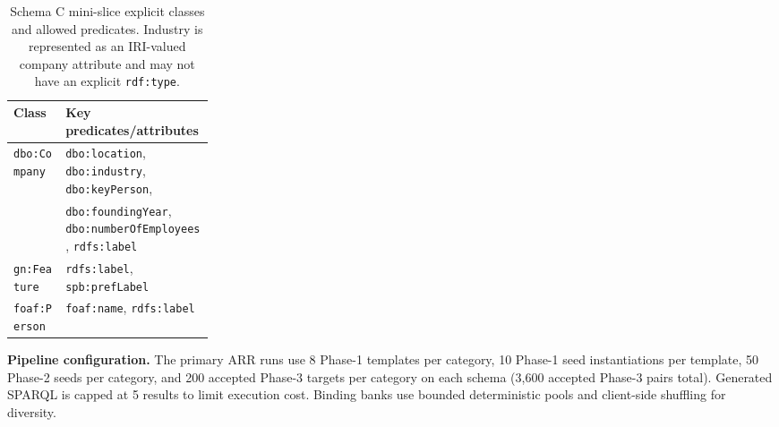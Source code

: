 \documentclass[11pt]{article}
\begin{document}
\begin{table}[t]
  \centering
  \small
  \setlength{\tabcolsep}{4pt}
  \begin{tabularx}{\linewidth}{>{\raggedright\arraybackslash}p{0.26\linewidth} X}
    \toprule
    Class & Key predicates/attributes \\
    \midrule
    \texttt{dbo:Company} & \texttt{dbo:location}, \texttt{dbo:industry}, \texttt{dbo:keyPerson}, \\
    & \texttt{dbo:foundingYear}, \texttt{dbo:numberOfEmployees}, \texttt{rdfs:label} \\
    \texttt{gn:Feature} & \texttt{rdfs:label}, \texttt{spb:prefLabel} \\
    \texttt{foaf:Person} & \texttt{foaf:name}, \texttt{rdfs:label} \\
    \bottomrule
  \end{tabularx}
	  \caption{Schema C mini-slice explicit classes and allowed predicates. Industry is represented as an IRI-valued company attribute and may not have an explicit \texttt{rdf:type}.}
  \label{tab:schema}
\end{table}

\textbf{Pipeline configuration.} The primary ARR runs use 8 Phase-1 templates per category, 10 Phase-1 seed instantiations per template, 50 Phase-2 seeds per category, and 200 accepted Phase-3 targets per category on each schema (3{,}600 accepted Phase-3 pairs total). Generated SPARQL is capped at 5 results to limit execution cost. Binding banks use bounded deterministic pools and client-side shuffling for diversity.

\begin{table}[t]
  \centering
  \small
\caption{Key primary-run configuration. The expanded runs keep the same category taxonomy while scaling accepted Phase-3 targets and moving reverse-query work into deterministic binding-bank construction.}
  \label{tab:config}
\end{table}
\end{document}
